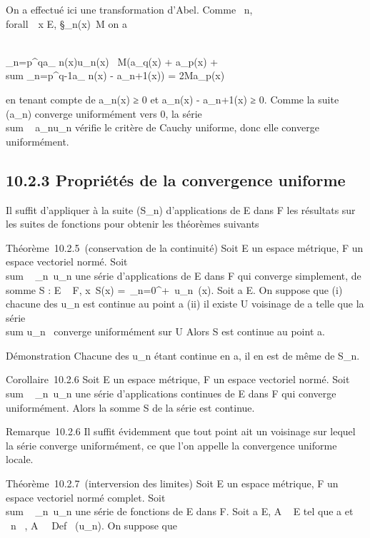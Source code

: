 \documentclass[]{article}
\begin{document}
On a effectué ici une transformation d'Abel. Comme
\forall~n, \\forall~~x \in E,
\S_n(x)\ \leq M
on a

\\\sum
_n=p^qa_
n(x)u_n(x)\ \leq
M(a_q(x) +
a_p(x) + \\sum
_n=p^q-1a_ n(x) -
a_n+1(x)) = 2Ma_p(x)

en tenant compte de a_n(x) ≥ 0 et a_n(x) -
a_n+1(x) ≥ 0. Comme la suite (a_n) converge
uniformément vers 0, la série
\\sum ~
a_nu_n vérifie le critère de Cauchy uniforme, donc
elle converge uniformément.

\subsection{10.2.3 Propriétés de la convergence uniforme}

Il suffit d'appliquer à la suite (S_n) d'applications de E dans
F les résultats sur les suites de fonctions pour obtenir les théorèmes
suivants

Théorème~10.2.5~(conservation de la continuité) Soit E un espace
métrique, F un espace vectoriel normé. Soit
\\sum ~
_n\in{}~u_n une série d'applications de E dans F qui
converge simplement, de somme S : E \rightarrow~ F,
x\mapsto~S(x) =\
\sum  _n=0^+\infty~u_n~(x).
Soit a \in E. On suppose que (i) chacune des u_n est continue au
point a (ii) il existe U voisinage de a telle que la série
\\sum  u_n~
converge uniformément sur U Alors S est continue au point a.

Démonstration Chacune des u_n étant continue en a, il en est de
même de S_n.

Corollaire~10.2.6 Soit E un espace métrique, F un espace vectoriel
normé. Soit \\sum ~
_n\in{}~u_n une série d'applications continues de E dans F
qui converge uniformément. Alors la somme S de la série est continue.

Remarque~10.2.6 Il suffit évidemment que tout point ait un voisinage sur
lequel la série converge uniformément, ce que l'on appelle la
convergence uniforme locale.

Théorème~10.2.7~(interversion des limites) Soit E un espace métrique, F
un espace vectoriel normé complet. Soit
\\sum ~
_n\in{}~u_n une série de fonctions de E dans F. Soit a \in E,
A \subset~ E tel que a \in\overlineA et
\forall~n \in {}~, A \subset~\ Def~
(u_n). On suppose que
\end{document}
